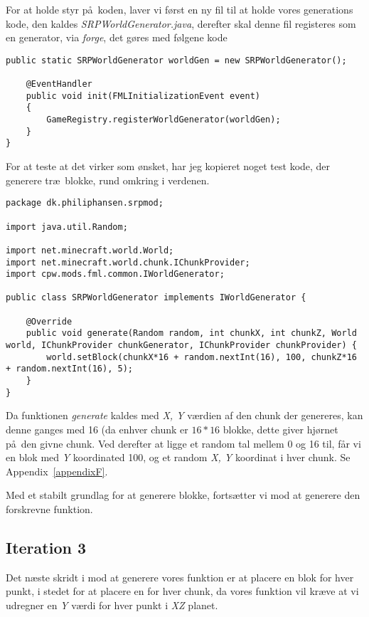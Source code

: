 \documentclass[a4paper,12pt]{report}
\begin{document}
			For at holde styr p\aa \ koden, laver vi f\o rst en ny fil til at holde vores generations kode, den kaldes \emph{SRPWorldGenerator.java},
			derefter skal denne fil registeres som en generator, via \emph{forge}, det g\o res med f\o lgene kode

\begin{lstlisting}[label=SRPMod2,caption=SRPMod.java]
    public static SRPWorldGenerator worldGen = new SRPWorldGenerator();
    
    @EventHandler
    public void init(FMLInitializationEvent event)
    {
        GameRegistry.registerWorldGenerator(worldGen);
    }
}
\end{lstlisting}
	
			For at teste at det virker som \o nsket, har jeg kopieret noget test kode, der generere tr\ae \ blokke,
			rund omkring i verdenen.

\begin{lstlisting}[label=SRPWorldGenerator,caption=SRPWorldGenerator.java]
package dk.philiphansen.srpmod;

import java.util.Random;

import net.minecraft.world.World;
import net.minecraft.world.chunk.IChunkProvider;
import cpw.mods.fml.common.IWorldGenerator;

public class SRPWorldGenerator implements IWorldGenerator {

    @Override
    public void generate(Random random, int chunkX, int chunkZ, World world, IChunkProvider chunkGenerator, IChunkProvider chunkProvider) {
        world.setBlock(chunkX*16 + random.nextInt(16), 100, chunkZ*16 + random.nextInt(16), 5);
    }
}
\end{lstlisting}

			Da funktionen \emph{generate} kaldes med \emph{X, Y} v\ae rdien af den chunk der genereres, kan
			denne ganges med 16 (da enhver chunk er \(16 * 16\) blokke, dette giver hj\o rnet p\aa \ den givne chunk.
			Ved derefter at ligge et random tal mellem 0 og 16 til, f\aa r vi en blok med \emph{Y} koordinated 100, og et random \emph{X, Y}
			koordinat i hver chunk. Se Appendix~\ref{appendixF}.

			Med et stabilt grundlag for at generere blokke, forts\ae tter vi mod at generere den forskrevne funktion.
		\subsection{Iteration 3}
			Det n\ae ste skridt i mod at generere vores funktion er at placere en blok for hver punkt, i stedet for at placere en
			for hver chunk, da vores funktion vil kr\ae ve at vi udregner en \emph{Y} v\ae rdi for hver punkt i \emph{XZ} planet.
\end{document}
